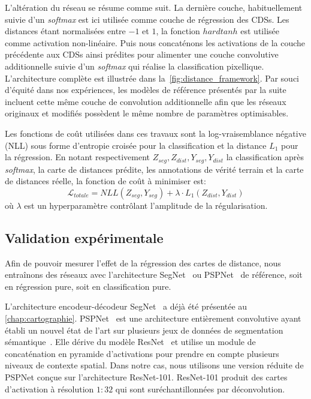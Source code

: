 L'altération du réseau se résume comme suit. La dernière couche, habituellement suivie d'un \textit{softmax} est ici utilisée comme couche de régression des \glspl{CDS}. Les distances étant normalisées entre $-1$ et $1$, la fonction $hardtanh$ est utilisée comme activation non-linéaire. Puis nous concaténons les activations de la couche précédente aux \glspl{CDS} ainsi prédites pour alimenter une couche convolutive additionnelle suivie d'un \textit{softmax} qui réalise la classification pixellique. L'architecture complète est illustrée dans la~\cref{fig:distance_framework}. Par souci d'équité dans nos expériences, les modèles de référence présentés par la suite incluent cette même couche de convolution additionnelle afin que les réseaux originaux et modifiés possèdent le même nombre de paramètres optimisables.

Les fonctions de coût utilisées dans ces travaux sont la log-vraisemblance négative (NLL) sous forme d'entropie croisée pour la classification et la distance $L_1$ pour la régression. En notant respectivement $Z_{seg}, Z_{dist}, Y_{seg}, Y_{dist}$ la classification après \textit{softmax}, la carte de distances prédite, les annotations de vérité terrain et la carte de distances réelle, la fonction de coût à minimiser est:
\begin{equation}
\mathcal{L}_\mathit{totale} = NLL(Z_{seg}, Y_{seg}) + \lambda \cdot L_1(Z_{dist}, Y_{dist})
\end{equation}
où $\lambda$ est un hyperparamètre contrôlant l'amplitude de la régularisation.

\subsection{Validation expérimentale}

Afin de pouvoir mesurer l'effet de la régression des cartes de distance, nous entraînons des réseaux avec l'architecture SegNet~\cite{badrinarayanan_segnet_2017} ou PSPNet~\cite{zhao_pyramid_2017} de référence, soit en régression pure, soit en classification pure.

L'architecture encodeur-décodeur SegNet~\cite{badrinarayanan_segnet_2017} a déjà été présentée au \cref{chap:cartographie}. PSPNet~\cite{zhao_pyramid_2017} est une architecture entièrement convolutive ayant établi un nouvel état de l'art sur plusieurs jeux de données de segmentation sémantique~\cite{cordts_cityscapes_2016,everingham_pascal_2014}. Elle dérive du modèle ResNet~\cite{he_deep_2016} et utilise un module de concaténation en pyramide d'activations pour prendre en compte plusieurs niveaux de contexte spatial. Dans notre cas, nous utilisons une version réduite de PSPNet conçue sur l'architecture ResNet-101. ResNet-101 produit des cartes d'activation à résolution $1{:}32$ qui sont suréchantillonnées par déconvolution.

